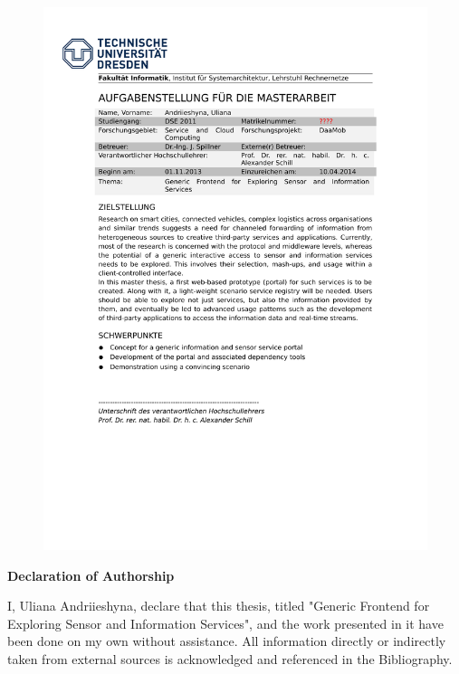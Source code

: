 \documentclass[a4paper, 12pt, twoside]{book}
\begin{document}
	
\newpage
\thispagestyle{empty}
\mbox{}

\newpage
\begin{figure}[h!]
\centering
\includegraphics[scale=0.9]{images/AUFGABENSTELLUNG_Uliana.pdf}
\end{figure}
\thispagestyle{empty}
\mbox{}

\newpage
\thispagestyle{empty}
\mbox{}
\newpage
\thispagestyle{empty}
\begingroup
  \vspace*{50 mm}
  {\huge \bf Declaration of Authorship}
  \vspace{10 mm}

  I, Uliana Andriieshyna, declare that this thesis, titled "Generic Frontend for Exploring Sensor and Information Services", and the work presented in it have been done on my own without assistance. All information directly or indirectly taken from external sources is acknowledged and referenced in the Bibliography.
\end{document}
